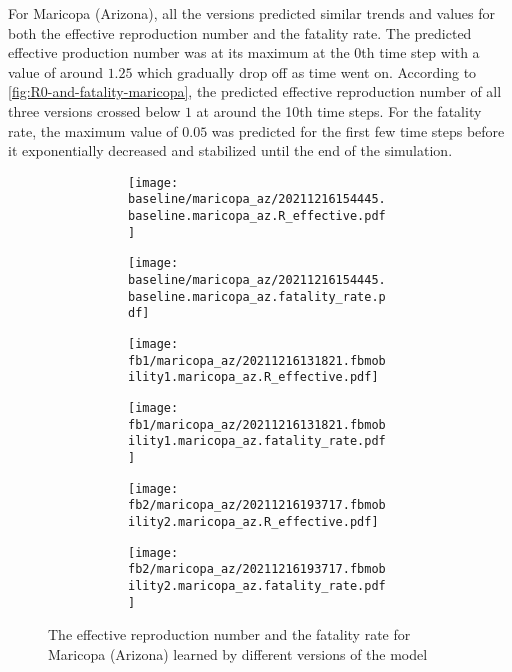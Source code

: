 For Maricopa (Arizona), all the versions predicted similar trends and values for both the effective reproduction number and the fatality rate.
The predicted effective production number was at its maximum at the 0th time step with a value of around $1.25$ which gradually drop off as time went on.
According to \autoref{fig:R0-and-fatality-maricopa}, the predicted effective reproduction number of all three versions crossed below $1$ at around the 10th time steps.
For the fatality rate, the maximum value of $0.05$ was predicted for the first few time steps before it exponentially decreased and stabilized until the end of the simulation.

\begin{figure}[!htb]
    \centering

    \begin{subfigure}[b]{\linewidth}
        \centering
        \begin{subfigure}[b]{0.4\linewidth}
            \texttt{[image: baseline/maricopa\_az/20211216154445.baseline.maricopa\_az.R\_effective.pdf]}
        \end{subfigure}
        \begin{subfigure}[b]{0.4\linewidth}
            \texttt{[image: baseline/maricopa\_az/20211216154445.baseline.maricopa\_az.fatality\_rate.pdf]}
        \end{subfigure}
    \end{subfigure}

    \begin{subfigure}[b]{\linewidth}
        \centering
        \begin{subfigure}[b]{0.4\linewidth}
            \texttt{[image: fb1/maricopa\_az/20211216131821.fbmobility1.maricopa\_az.R\_effective.pdf]}
        \end{subfigure}
        \begin{subfigure}[b]{0.4\linewidth}
            \texttt{[image: fb1/maricopa\_az/20211216131821.fbmobility1.maricopa\_az.fatality\_rate.pdf]}
        \end{subfigure}
    \end{subfigure}

    \begin{subfigure}[b]{\linewidth}
        \centering
        \begin{subfigure}[b]{0.4\linewidth}
            \texttt{[image: fb2/maricopa\_az/20211216193717.fbmobility2.maricopa\_az.R\_effective.pdf]}
        \end{subfigure}
        \begin{subfigure}[b]{0.4\linewidth}
            \texttt{[image: fb2/maricopa\_az/20211216193717.fbmobility2.maricopa\_az.fatality\_rate.pdf]}
        \end{subfigure}
    \end{subfigure}

    \caption{The effective reproduction number and the fatality rate for Maricopa (Arizona) learned by different versions of the model}
    \label{fig:R0-and-fatality-maricopa}
\end{figure}
